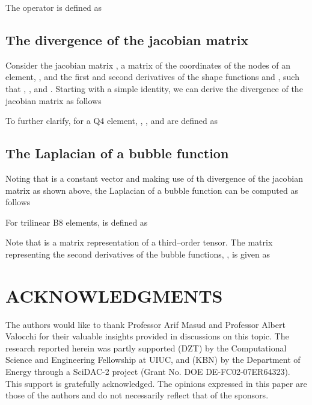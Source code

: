 \documentclass[11pt]{amsart}
\begin{document}
The  operator is defined as

\subsection*{ The divergence of the jacobian matrix}
Consider the jacobian matrix  , a matrix of the coordinates of the nodes of an element, , and the first and second derivatives of the shape functions  and , such that , , and .  Starting with a simple identity, we can derive the divergence of the jacobian matrix as follows

To further clarify, for a Q4 element, , , and  are defined as

\subsection*{ The Laplacian of a bubble function}
Noting that  is a constant vector and making use of th divergence of the jacobian matrix as shown above, the Laplacian of a bubble function can be computed as follows

For trilinear B8 elements,  is defined as

Note that  is a matrix representation of a third--order tensor.  The matrix representing the second derivatives of the bubble functions, , is given as 
 

\section*{ACKNOWLEDGMENTS}
The authors would like to thank Professor Arif Masud and Professor Albert Valocchi for their valuable insights provided in discussions on this topic. The research reported herein was partly 
supported (DZT) by the Computational Science and Engineering Fellowship at UIUC, and (KBN) by the Department of Energy through a SciDAC-2 project (Grant No. 
DOE DE-FC02-07ER64323). This support is gratefully acknowledged. The opinions 
expressed in this paper are those of the authors and do not necessarily reflect 
that of the sponsors. 



\newpage
\end{document}
